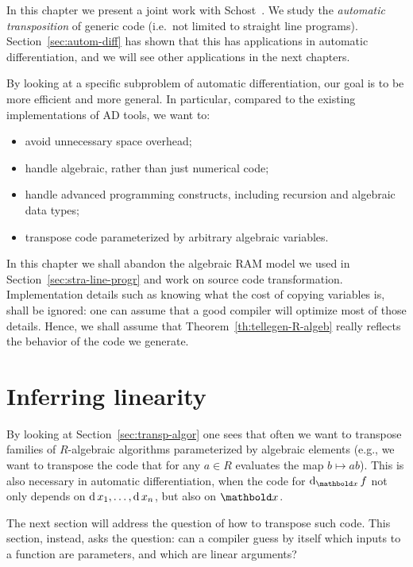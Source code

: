 

In this chapter we present a joint work with
Schost~\cite{df+schost10}. We study the
\emph{automatic transposition} of
generic code (i.e.\ not limited to straight line programs).
Section~\ref{sec:autom-diff} has shown that this has applications in
automatic differentiation, and we will see other applications in the
next chapters.

By looking at a specific subproblem of automatic differentiation, our
goal is to be more efficient and more general. In particular, compared
to the existing implementations of AD tools, we want to:
\begin{itemize}
\item avoid unnecessary space overhead;
\item handle algebraic, rather than just numerical code;
\item handle advanced programming constructs, including recursion and
  algebraic data types;
\item transpose code parameterized by arbitrary algebraic variables.
\end{itemize}

In this chapter we shall abandon the algebraic RAM model we used in
Section~\ref{sec:stra-line-progr} and work on source code
transformation. Implementation details such as knowing what the cost
of copying variables is, shall be ignored: one can assume that a good
compiler will optimize most of those details. Hence, we shall assume
that Theorem~\ref{th:tellegen-R-algeb} really reflects the behavior of
the code we generate.


\section{Inferring linearity}
\label{sec:inference}
\lstset{language=haskell}

By looking at Section~\ref{sec:transp-algor} one sees that often we
want to transpose families of $R$-algebraic algorithms parameterized
by algebraic elements (e.g., we want to transpose the code that for
any $a\in R$ evaluates the map $b\mapsto ab$). This is also necessary
in automatic differentiation, when the code for $\diff_{\lst{x}} f$
not only depends on $\operatorname{d} x_1,\ldots,\operatorname{d} x_n$, but also on
$\lst{x}$.

The next section will address the question of how to transpose such
code. This section, instead, asks the question: can a compiler guess
by itself which inputs to a function are parameters, and which are
linear arguments?


